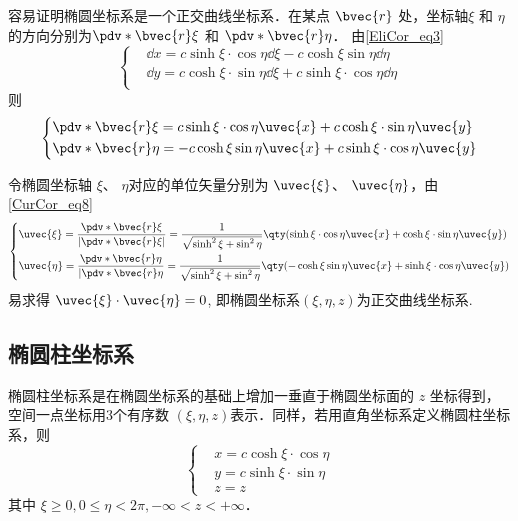 容易证明椭圆坐标系是一个正交曲线坐标系．在某点 $\bvec{r}$ 处，坐标轴$\xi$ 和 $\eta$ 的方向分别为$\pdv*{\bvec{r}}{\xi}$ 和 $\pdv*{\bvec{r}}{\eta}$．
由\autoref{EliCor_eq3} 
\begin{equation}
\left\{
    \begin{aligned}
    &\dd x=c\sinh\xi\cdot\cos\eta\dd\xi-c\cosh\xi\sin\eta\dd\eta\\
    &\dd y=c\cosh\xi\cdot\sin\eta\dd\xi+c\sinh\xi\cdot\cos\eta\dd\eta\\
    \end{aligned}\right.
\end{equation}
则
\begin{equation}
\left\{
    \begin{aligned}
&\pdv*{\bvec{r}}{\xi}=c\sinh\xi\cdot\cos\eta\uvec{x}+c\cosh\xi\cdot\sin\eta\uvec{y}\\
&\pdv*{\bvec{r}}{\eta}=-c\cosh\xi\sin\eta\uvec{x}+c\sinh\xi\cdot\cos\eta\uvec{y}\\
    \end{aligned}\right.
\end{equation}

令椭圆坐标轴 $\xi$、 $\eta$对应的单位矢量分别为 $\uvec{\xi}$、 $\uvec{\eta}$，由\autoref{CurCor_eq8}~
\begin{equation}
\left\{
    \begin{aligned}
    &\uvec{\xi}=\frac{\pdv*{\bvec{r}}{\xi}}{|\pdv*{\bvec{r}}{\xi}|}=\frac{1}{\sqrt{\sinh^2\xi+\sin^2\eta}}\qty(\sinh\xi\cdot\cos\eta\uvec{x}+\cosh\xi\cdot\sin\eta\uvec{y})\\
    &\uvec{\eta }=\frac{\pdv*{\bvec{r}}{\eta}}{|\pdv*{\bvec{r}}{\eta}}=\frac{1}{\sqrt{\sinh^2\xi+\sin^2\eta}}\qty(-\cosh\xi\sin\eta\uvec{x}+\sinh\xi\cdot\cos\eta\uvec{y})\\
    \end{aligned}\right.
\end{equation}
易求得 $\uvec{\xi}\cdot\uvec{\eta}=0$, 即椭圆坐标系$(\xi,\eta,z)$为正交曲线坐标系.
\subsection{椭圆柱坐标系}
椭圆柱坐标系是在椭圆坐标系的基础上增加一垂直于椭圆坐标面的 $z$ 坐标得到，空间一点坐标用3个有序数 $(\xi,\eta,z)$表示．同样，若用直角坐标系定义椭圆柱坐标系，则
\begin{equation}\label{EliCor_eq1}
\left\{\begin{aligned}
&x=c\cosh\xi\cdot\cos\eta\\
&y=c\sinh\xi\cdot\sin\eta\\
&z=z
\end{aligned}\right.
\end{equation}
其中 $\xi\geq0,0\leq\eta<2\pi,-\infty<z<+\infty$．

